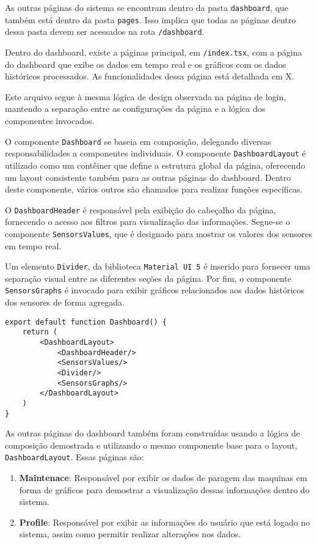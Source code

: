 As outras páginas do sistema se encontram dentro da pasta \texttt{dashboard}, que também está dentro da pasta \texttt{pages}. Isso implica que todas as páginas dentro dessa pasta devem ser acessados na rota \texttt{/dashboard}.

Dentro do dashboard, existe a páginas principal, em \texttt{/index.tsx}, com a página do dashboard que exibe os dados em tempo real e os gráficos com os dados históricos processados. As funcionalidades dessa página está detalhada em X. %

Este arquivo segue à mesma lógica de design observada na página de login, mantendo a separação entre as configurações da página e a lógica dos componentes invocados.

O componente \texttt{Dashboard} se baseia em composição, delegando diversas responsabilidades a componentes individuais. O componente \texttt{DashboardLayout} é utilizado como um contêiner que define a estrutura global da página, oferecendo um layout consistente também para as outras páginas do dashboard. Dentro deste componente, vários outros são chamados para realizar funções específicas.

O \texttt{DashboardHeader} é responsável pela exibição do cabeçalho da página, fornecendo o acesso aos filtros para visualização das informações. Segue-se o componente \texttt{SensorsValues}, que é designado para mostrar os valores dos sensores em tempo real.

Um elemento \texttt{Divider}, da biblioteca \texttt{Material UI 5} é inserido para fornecer uma separação visual entre as diferentes seções da página. Por fim, o componente \texttt{SensorsGraphs} é invocado para exibir gráficos relacionados aos dados históricos dos sensores de forma agregada.

\begin{verbatim}
export default function Dashboard() {
    return (
        <DashboardLayout>
            <DashboardHeader/>
            <SensorsValues/>
            <Divider/>
            <SensorsGraphs/>
        </DashboardLayout>
    )
}
\end{verbatim}

As outras páginas do dashboard também foram construídas usando a lógica de composição demostrada e utilizando o mesmo componente base para o layout, \texttt{DashboardLayout}. Essas páginas são:
\begin{enumerate}
    \item \textbf{Maintenace}: Responsável por exibir os dados de paragem das maquinas em forma de gráficos para demostrar a visualização dessas informações dentro do sistema. %
    \item \textbf{Profile}: Responsável por exibir as informações do usuário que está logado no sistema, assim como permitir realizar alterações nos dados. %
\end{enumerate}


